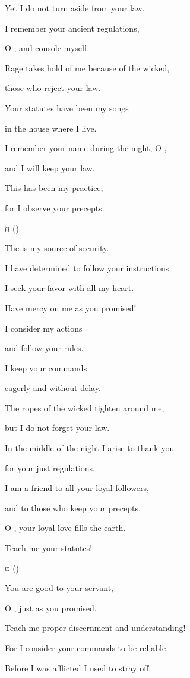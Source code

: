 {\par }{\Q Yet I do not
turn aside
from your law.
\par }{\Q {}I remember
your ancient
regulations,
\par }{\Q O
{}, and console myself.
\par }{\Q {}Rage
takes hold
of me because of the wicked,
\par }{\Q those who reject
your law.
\par }{\Q {}Your statutes
have been my songs
\par }{\Q in the house
where I live.
\par }{\Q {}I remember
your name
during the night,
O
{},
\par }{\Q and I will keep
your law.
\par }{\Q {}This
has
been
my practice,
\par }{\Q for
I observe
your precepts.
\par }{\SH ח ({})
\par }{\Q {}The
{} is my source of security.
\par }{\Q I have determined to follow your instructions.
\par }{\Q {}I seek
your favor with all
my heart.
\par }{\Q Have mercy
on me as you promised!
\par }{\Q {}I consider
my
actions
\par }{\Q and follow
your rules.
\par }{\Q {}I keep
your commands
\par }{\Q eagerly
and without
delay.
\par }{\Q {}The ropes
of the wicked
tighten
around me,
\par }{\Q but
I do not
forget
your law.
\par }{\Q {}In the middle
of the night
I arise
to thank
you
\par }{\Q for your just regulations.
\par }{\Q {}I am
a friend
to all
your loyal followers,
\par }{\Q and to those
who keep
your precepts.
\par }{\Q {}O
{}, your loyal love
fills
the earth.
\par }{\Q Teach
me your statutes!
\par }{\SH ט ({})
\par }{\Q {}You are good to your servant,
\par }{\Q O
{}, just as you promised.
\par }{\Q {}Teach
me proper
discernment
and understanding!
\par }{\Q For
I consider your commands
to be reliable.
\par }{\Q {}Before
I was afflicted
I
used to stray
off,

}
